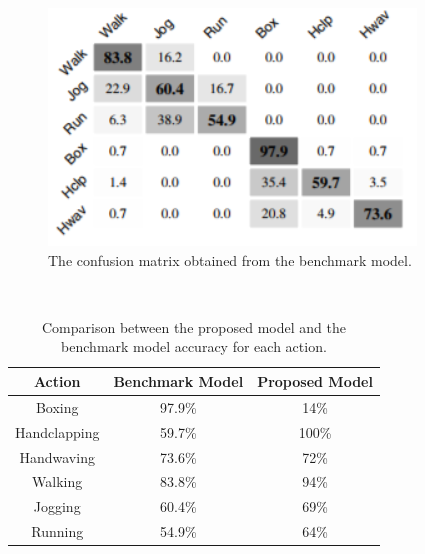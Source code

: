     \begin{figure}[ht]
    \centering
    \includegraphics{Figures/bench}
    \decoRule
    \caption [The confusion matrix obtained from the benchmark model.]{The confusion matrix obtained from the benchmark model.}
    \label{fig:la}
    \end{figure}\hfill \\
    \begin{table}[ht]
    \centering
    \begin{tabular}{|c|c|c|}
    \hline
    \textbf{Action} & \textbf{Benchmark Model} & \textbf{Proposed Model} \\ \hline
    Boxing          & 97.9\%                     & 14\%                     \\ \hline
    Handclapping    & 59.7\%                     & 100\%                    \\ \hline
    Handwaving      & 73.6\%                     & 72\%                     \\ \hline
    Walking         & 83.8\%                     & 94\%                     \\ \hline
    Jogging         & 60.4\%                     & 69\%                     \\ \hline
    Running         & 54.9\%                     & 64\%                     \\ \hline
    \end{tabular}
    \caption{Comparison between the proposed model and the benchmark model accuracy for each action.}
    \label{my-label}
    \end{table}\hfill \\
